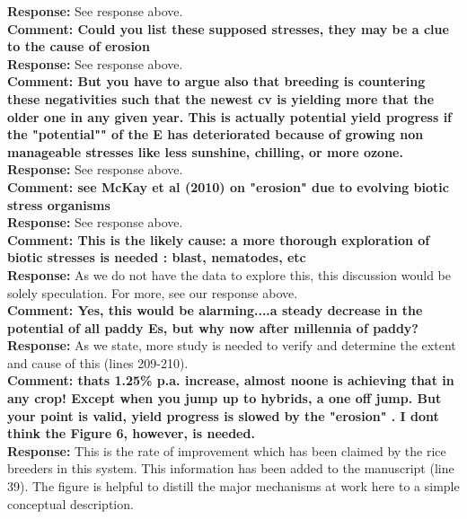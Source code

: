\documentclass{article} \usepackage[margin=1in]{geometry}
\begin{document}
\textbf{Response: } See response above.\\

\textbf{Comment: Could you list these supposed stresses, they may be a
  clue to the cause of erosion}\\

\textbf{Response: } See response above.\\

\textbf{Comment: But you have to argue also that breeding is
  countering these negativities such that the newest cv is yielding
  more that the older one in any given year. This is actually
  potential yield progress if the "potential"" of the E has
  deteriorated because of growing non manageable stresses like less
  sunshine, chilling, or more ozone.}\\

\textbf{Response: } See response above.\\

\textbf{Comment: see McKay et al (2010) on "erosion" due to evolving
  biotic stress organisms}\\

\textbf{Response: } See response above.\\

\textbf{Comment: This is the likely cause: a more thorough exploration
  of biotic stresses is needed : blast, nematodes, etc}\\

\textbf{Response: } As we do not have the data to explore this, this
discussion would be solely speculation. For more, see our response
above.\\

\textbf{Comment: Yes, this would be alarming....a steady decrease in
  the potential of all paddy Es, but why now after millennia of
  paddy?}\\

\textbf{Response: } As we state, more study is needed to verify and
determine the extent and cause of this (lines 209-210).\\

\textbf{Comment: thats 1.25\% p.a. increase, almost noone is achieving
  that in any crop! Except when you jump up to hybrids, a one off
  jump. But your point is valid, yield progress is slowed by the
  "erosion" . I dont think the Figure 6,  however, is needed.}\\

\textbf{Response: } This is the rate of improvement which has been
claimed by the rice breeders in this system. This information has been
added to the manuscript (line 39). The figure is
helpful to distill the major mechanisms at work here to a simple
conceptual description.\\
\end{document}
